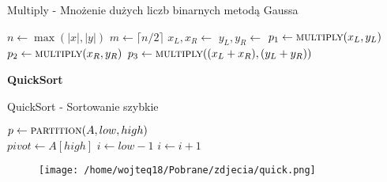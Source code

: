 \documentclass{article}
\begin{document}
\begin{algorithm}[H]
    \caption{Multiply - Mnożenie dużych liczb binarnych metodą Gaussa}
    \label{alg:multiply}
    \begin{algorithmic}[1]
            \State $n \gets \max(|x|, |y|)$ 
                \State {}
            \EndIf
            \State $m \gets \lceil {n/2} \rceil$
            \State $x_L, x_R \gets$ 
            \State $y_L, y_R \gets$ 
            \State $p_1 \gets \Call{multiply}{x_L, y_L}$
            \State $p_2 \gets \Call{multiply}{x_R, y_R}$
            \State $p_3 \gets \Call{multiply}{(x_L + x_R), (y_L + y_R)}$
            \State {}
        \EndProcedure
    \end{algorithmic}
\end{algorithm}
\textbf{QuickSort}
\begin{algorithm}[H]
    \caption{QuickSort - Sortowanie szybkie}
    \label{alg:quicksort}
    \begin{algorithmic}[1]
                \State $p \gets \Call{partition}{A, low, high}$
                \State {}
                \State {}
            \EndIf
        \EndProcedure
        \\
            \State $pivot \gets A[high]$
            \State $i \gets low - 1$
                    \State $i \gets i + 1$
                    \State {}
                \EndIf
            \EndFor
            \State {}
            \State {}
        \EndProcedure
    \end{algorithmic}
\end{algorithm}
\begin{figure}[H]
    \centering
    \texttt{[image: /home/wojteq18/Pobrane/zdjecia/quick.png]}
    \label{fig:example_image}
\end{figure}
\end{document}
